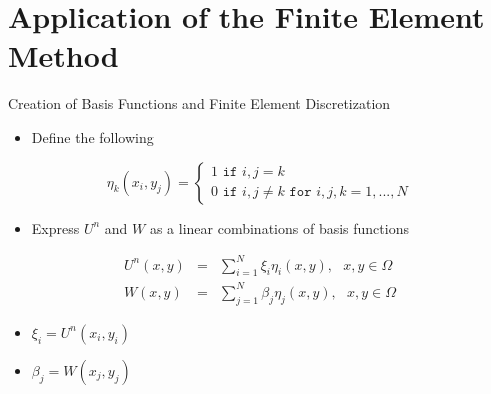 \documentclass[10pt]{beamer}
\begin{document}
\section{Application of the Finite Element Method}
\begin{frame}{Creation of Basis Functions and Finite Element Discretization} \label{basisfunctionandfinite}
\begin{itemize}
\item Define the following
\end{itemize}
$$
\eta_{k}\left(x_{i},y_{j}\right)=\begin{cases}
1 \texttt{ if } i,j=k\\
0 \texttt{ if } i,j \neq k \texttt{ for } i,j,k=1,...,N
\end{cases} 
$$

\begin{itemize}
\item Express $U^{n}$ and $W$ as a linear combinations of basis functions
\end{itemize}

\begin{eqnarray}\label{UWdiscrete}
U^{n}\left(x,y\right)&=&\sum_{i=1}^{N}\xi_{i}\eta_{i}\left(x,y\right), \texttt{ } x,y \in \Omega \\
\nonumber
W\left(x,y\right)&=&\sum_{j=1}^{N}\beta_{j}\eta_{j}\left(x,y\right), \texttt{ } x,y \in \Omega
\end{eqnarray}

\begin{itemize}
\item $\xi_{i}=U^{n}\left(x_{i},y_{i}\right)$
\item $\beta_{j}=W\left(x_{j},y_{j}\right)$
\end{itemize}

\hyperlink{Questions}{}
\end{frame}
\end{document}
